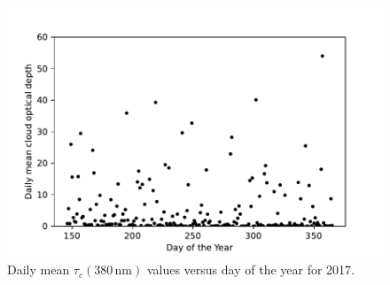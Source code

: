 \documentclass{optica-article}
\begin{document}
\begin{figure}[H]
	\centering
	\includegraphics[width=0.7\linewidth]{COD_vs_DOY_2017}
	\caption{Daily mean $\tau_c{\scriptstyle(380 \, \text{nm})}$ values versus day of the year for 2017.}
	\label{fig:codvsdoy2017}
\end{figure}






\end{document}
